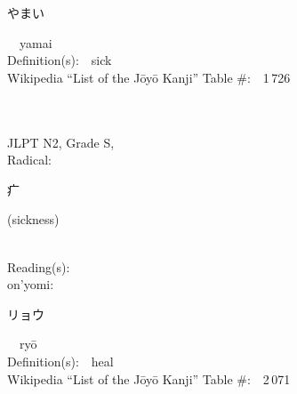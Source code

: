 \begin{multicols}{2}
{\hspace*{2em}}{\begin{CJK}{UTF8}{min} やまい \end{CJK}}\ \ yamai\ \ \\
Definition(s):\ \ sick \\
Wikipedia ``List of the J\=oy\=o Kanji'' Table \#:\ \ 1\,726 \\
\ \ \\
{\fontsize{34pt}{40pt}  }\ \ \\  %
{JLPT N2, Grade S, \\Radical:\ \ {\begin{CJK}{UTF8}{min} 疒 \end{CJK}} (sickness) } \\
Reading(s):\ \ \\
{\hspace*{1em}}on'yomi:\ \ \\
{\hspace*{2em}}{\begin{CJK}{UTF8}{min} リョウ \end{CJK}}\ \ ry\=o\ \ \\
Definition(s):\ \ heal \\
Wikipedia ``List of the J\=oy\=o Kanji'' Table \#:\ \ 2\,071 \\
\ \ \\
\end{multicols}




